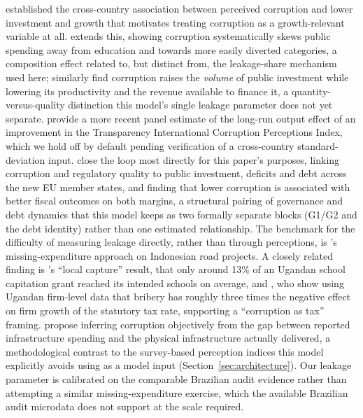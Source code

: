 \documentclass[11pt,a4paper]{article}
\begin{document}
\citet{mauro1995} established the cross-country association between perceived corruption and lower investment and growth that motivates treating corruption as a growth-relevant variable at all. \citet{mauro1998} extends this, showing corruption systematically skews public spending away from education and towards more easily diverted categories, a composition effect related to, but distinct from, the leakage-share mechanism used here; \citet{tanzidavoodi1997} similarly find corruption raises the \emph{volume} of public investment while lowering its productivity and the revenue available to finance it, a quantity-versus-quality distinction this model's single leakage parameter does not yet separate. \citet{grundlerpotrafke2019} provide a more recent panel estimate of the long-run output effect of an improvement in the Transparency International Corruption Perceptions Index, which we hold off by default pending verification of a cross-country standard-deviation input. \citet{hanousekkocenda2011} close the loop most directly for this paper's purposes, linking corruption and regulatory quality to public investment, deficits and debt across the new EU member states, and finding that lower corruption is associated with better fiscal outcomes on both margins, a structural pairing of governance and debt dynamics that this model keeps as two formally separate blocks (G1/G2 and the debt identity) rather than one estimated relationship. The benchmark for the difficulty of measuring leakage directly, rather than through perceptions, is \citet{olken2007}'s missing-expenditure approach on Indonesian road projects. A closely related finding is \citet{reinikkasvensson2004}'s ``local capture'' result, that only around 13\% of an Ugandan school capitation grant reached its intended schools on average, and \citet{fismansvensson2007}, who show using Ugandan firm-level data that bribery has roughly three times the negative effect on firm growth of the statutory tax rate, supporting a ``corruption as tax'' framing. \citet{goldenpicci2005} propose inferring corruption objectively from the gap between reported infrastructure spending and the physical infrastructure actually delivered, a methodological contrast to the survey-based perception indices this model explicitly avoids using as a model input (Section~\ref{sec:architecture}). Our leakage parameter is calibrated on the comparable Brazilian audit evidence rather than attempting a similar missing-expenditure exercise, which the available Brazilian audit microdata does not support at the scale required.
\end{document}
